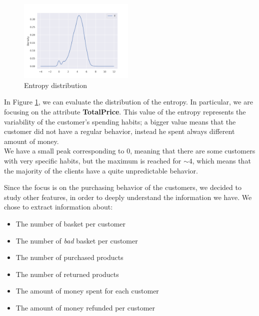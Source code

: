 \begin{figure}
\centering
\captionsetup{justification=centering}
\includegraphics[width=0.49\textwidth]{img/kde_entropy.png}
\caption{Entropy distribution}
\label{fig:kde_entropy}
\end{figure}

In Figure \ref{fig:kde_entropy}, we can evaluate the distribution of the entropy. In particular, we are focusing on the attribute \textbf{TotalPrice}.
This value of the entropy represents the variability of the customer's spending habits; a bigger value means that the customer did not have a regular behavior, instead he spent always different amount of money.\\
We have a small peak corresponding to 0, meaning that there are some customers with very specific habits, but the maximum is reached for $\sim 4$, which means that the majority of the clients have a quite unpredictable behavior.

Since the focus is on the purchasing behavior of the customers, we decided to study other features, in order to deeply understand the information we have. We chose to extract information about:
\begin{itemize}
\item The number of basket per customer
\item The number of \emph{bad} basket per customer
\item The number of purchased products
\item The number of returned products
\item The amount of money spent for each customer
\item The amount of money refunded per customer
\end{itemize}

